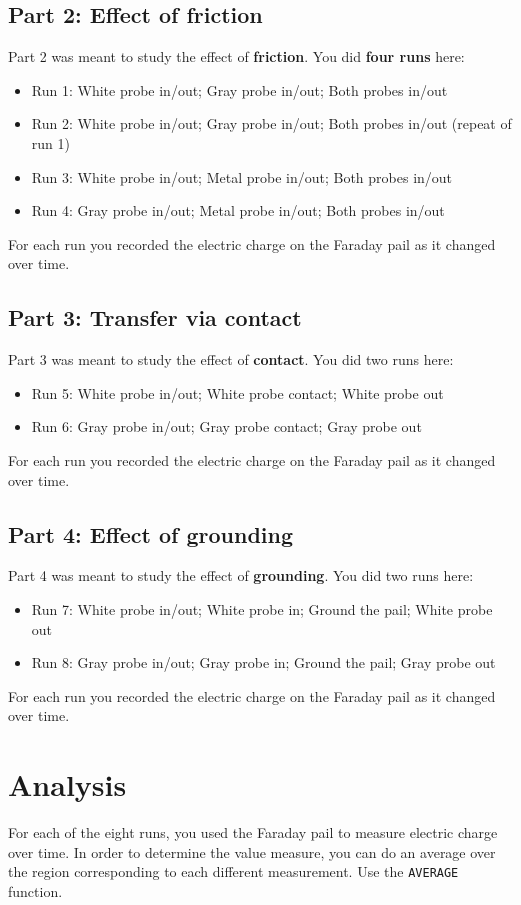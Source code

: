 \subsection{Part 2: Effect of friction}
%
Part 2 was meant to study the effect of \textbf{friction}. You did \textbf{four runs} here:
\begin{itemize}
	\item Run 1: White probe in/out; Gray probe in/out; Both probes in/out
	\item Run 2: White probe in/out; Gray probe in/out; Both probes in/out (repeat of run 1)
	\item Run 3: White probe in/out; Metal probe in/out; Both probes in/out
	\item Run 4: Gray probe in/out; Metal probe in/out; Both probes in/out
\end{itemize}
For each run you recorded the electric charge on the Faraday pail as it changed over time.
%
\subsection{Part 3: Transfer via contact}
%
Part 3 was meant to study the effect of \textbf{contact}. You did two runs here:
\begin{itemize}
	\item Run 5: White probe in/out; White probe contact; White probe out
	\item Run 6: Gray probe in/out; Gray probe contact; Gray probe out
\end{itemize}
For each run you recorded the electric charge on the Faraday pail as it changed over time.
%
\subsection{Part 4: Effect of grounding}
%
Part 4 was meant to study the effect of \textbf{grounding}. You did two runs here:
\begin{itemize}
	\item Run 7: White probe in/out; White probe in; Ground the pail; White probe out
	\item Run 8: Gray probe in/out; Gray probe in; Ground the pail; Gray probe out
\end{itemize}
For each run you recorded the electric charge on the Faraday pail as it changed over time.
%
\section{Analysis}
%
For each of the eight runs, you used the Faraday pail to measure electric charge over time. In order to determine the value measure, you can do an average over the region corresponding to each different measurement. Use the \texttt{AVERAGE} function.
%
